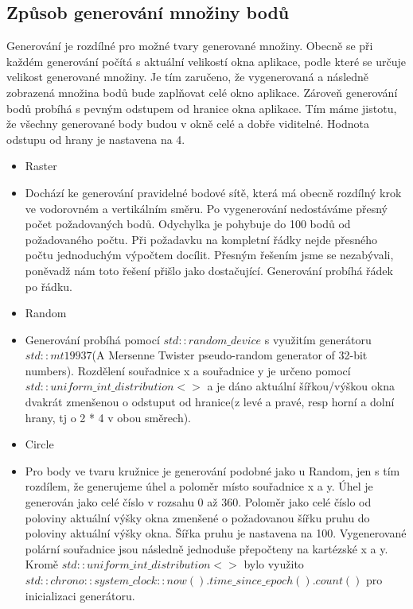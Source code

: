 \documentclass[12pt]{article}
\begin{document}
\subsection{Způsob generování množiny bodů}
Generování je rozdílné pro možné tvary generované množiny. Obecně se při každém generování počítá s aktuální velikostí okna aplikace, podle které se určuje velikost generované množiny. Je tím zaručeno, že vygenerovaná a následně zobrazená množina bodů bude zaplňovat celé okno aplikace. Zároveň generování bodů probíhá s pevným odstupem od hranice okna aplikace. Tím máme jistotu, že všechny generované body budou v okně celé a dobře viditelné. Hodnota odstupu od hrany je nastavena na 4.
\begin{itemize}
\item Raster
\item[] Dochází ke generování pravidelné bodové sítě, která má obecně rozdílný krok ve vodorovném a vertikálním směru. Po vygenerování nedostáváme přesný počet požadovaných bodů. Odychylka je pohybuje do 100 bodů od požadovaného počtu. Při požadavku na kompletní řádky nejde přesného počtu jednoduchým výpočtem docílit. Přesným řešením jsme se nezabývali, poněvadž nám toto řešení přišlo jako dostačující.  Generování probíhá řádek po řádku.
\item Random
\item[] Generování probíhá pomocí  $std::random\_device$ s využitím generátoru $std::mt19937$(A Mersenne Twister pseudo-random generator of 32-bit numbers). Rozdělení souřadnice x a souřadnice y je určeno pomocí $std::uniform\_int\_distribution<>$ a je dáno aktuální šířkou/výškou okna dvakrát zmenšenou o odstuput od hranice(z levé a pravé, resp horní a dolní hrany, tj o 2 * 4 v obou směrech).
\item Circle
\item[] Pro body ve tvaru kružnice je generování podobné jako u Random, jen s tím rozdílem, že generujeme úhel a poloměr místo souřadnice x a y. Úhel je generován jako celé číslo v rozsahu 0 až 360. Poloměr jako celé číslo od poloviny aktuální výšky okna zmenšené o požadovanou šířku pruhu do poloviny aktuální výšky okna. Šířka pruhu je nastavena na 100. Vygenerované polární souřadnice jsou následně jednoduše přepočteny na kartézské x a y. Kromě $std::uniform\_int\_distribution<>$ bylo využito $std::chrono::system\_clock::now().time\_since\_epoch().count()$ pro inicializaci generátoru.
\end{itemize}


\clearpage 
\end{document}
